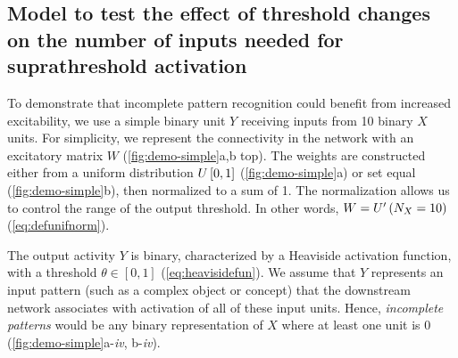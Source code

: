 \subsection{Model to test the effect of threshold changes on the number of inputs needed for suprathreshold activation}

To demonstrate that incomplete pattern recognition could benefit from increased excitability,
        we use a simple binary unit $Y$ receiving inputs from 10 binary $X$ units.
    For simplicity, we represent the connectivity in the network with an excitatory matrix $W$ (\autoref{fig:demo-simple}a,b top).
    The weights are constructed either from
        a uniform distribution $U\left[0,1\right]$ (\autoref{fig:demo-simple}a)
        or set equal (\autoref{fig:demo-simple}b),
        then normalized to a sum of 1.
    The normalization allows us to control the range of the output threshold.
    In other words, $W = U^{\prime}\left(N_X = 10\right)$ (\autoref{eq:defunifnorm}).

The output activity $Y$ is binary, characterized by a Heaviside activation function,
        with a threshold $\theta \in [0, 1]$ (\autoref{eq:heavisidefun}).
    We assume that $Y$ represents an input pattern (such as a complex object or concept)
        that the downstream network associates with activation of all of these input units.
    Hence, \textit{incomplete patterns} would be any binary representation of $X$
        where at least one unit is $0$ (\autoref{fig:demo-simple}a-\textit{iv}, b-\textit{iv}).
